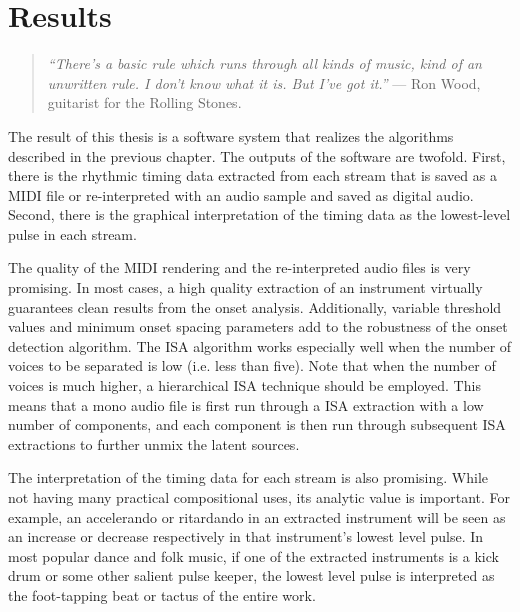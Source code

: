 \chapter{Results}
\vspace{10mm}

\begin{quote}
  {\it ``There's a basic rule which runs through all kinds of music, 
    kind of an unwritten rule. I don't know what it is.  But I've got
    it.''} --- Ron Wood, guitarist for the Rolling Stones.
\end{quote}


\vspace{7mm}

The result of this thesis is a software system that 
realizes the algorithms described in the previous chapter. 
The outputs of the software are twofold. First, there is the rhythmic 
timing data extracted from each stream that is saved as a MIDI file or
re-interpreted  with an audio sample and saved as digital audio.
Second, there is the graphical interpretation of the timing data as the 
lowest-level pulse in each stream.


The quality of the MIDI rendering and the re-interpreted audio files is
very promising.  In most cases, a high quality extraction of an
instrument virtually guarantees clean results from the onset
analysis. Additionally, variable threshold values and minimum
onset spacing parameters add to the robustness of the onset detection
algorithm. The ISA algorithm works especially well when the number of
voices to be separated is low (i.e. less than five). Note that when the
number of voices is much higher, a hierarchical ISA technique 
should be employed. This means that a mono audio file is first run through a
ISA extraction with a low number of components, and each component is
then run through subsequent ISA extractions to further unmix the
latent sources.

The interpretation of the timing data for each stream is also promising.
While not having many practical compositional uses, its
analytic value is important.  For example, an accelerando or
ritardando in an extracted instrument will be seen as an increase or 
decrease respectively in that instrument's lowest level
pulse. In most popular dance and folk music, if one of the extracted 
instruments is a kick drum or some other salient pulse keeper, the
lowest  level pulse is interpreted as the foot-tapping beat or tactus 
of the entire work.

